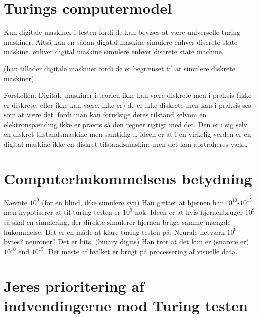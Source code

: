 \documentclass{article}
\author{Mikkel Kragh Mathiesen, Jannik Gram, Rune \& Rasmus Abrahams{\tt (son|en)}}
\title{}
\date{\today}
\begin{document}
\maketitle
\section{Turings computermodel}
Kun digitale maskiner i testen fordi de kan bevises at være universelle turing-maskiner.
Altså kan en sådan digatal maskine simulere enhver discrete state maskine.
enhver digital maskine simulere enhver discrete state machine.

(han tillader digitale maskiner fordi de er begrænset til at simulere diskrete maskiner)

Forskellen: Digitale maskiner i teorien ikke kan være diskrete men i praksis (ikke er diskrete, eller ikke kan være, ikke er) de er ikke diskrete men kan i praksis ses som at være det. fordi man kan forudsige deres tilstand selvom en elektronspænding ikke er præcis så den regner rigtigt med det.
Den er i sig selv en diskret tilstandsmaskine men samtidig … ideen er at i en virkelig verden er en digital maskine ikke en  diskret tilstandsmaskine men det kan abstraheres væk…

\section{Computerhukommelsens betydning}
Nævnte $10^9$ (for en blind, ikke simulere syn)
Han gætter at hjernen har $10^10$-$10^15$ men hypotiserer at til turing-testen er $10^9$ nok.
Ideen er at hvis hjernenbruger $10^9$ så skal en simulering, der direkte simulerer hjernen bruge samme mængde hukommelse. Det er en måde at klare turing-testen på.
Neurale netværk
$10^9$ bytes? neuroner? Det er bits. (binary digits)
Han tror at det kun er (snarere er) $10^10$ end $10^15$.
Det meste af hvilket er brugt på processering af visuelle data.

\section{Jeres prioritering af indvendingerne mod Turing testen}
\end{document}
